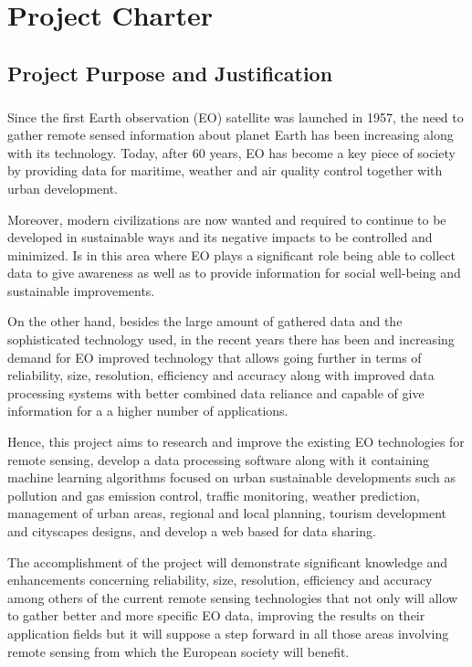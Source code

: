 \chapter{Project Charter}

\section{Project Purpose and Justification}

\paragraph{} 

Since the first Earth observation (EO) satellite was launched in 1957, the need to gather remote sensed information about planet Earth has been increasing along with its technology. Today, after 60 years, EO has become a key piece of society by providing data for maritime, weather and air quality control together with urban development. 

Moreover, modern civilizations are now wanted and required to continue to be developed in sustainable ways and its negative impacts to be controlled and minimized. Is in this area where EO plays a significant role being able to collect data to give awareness as well as to provide information for social well-being and sustainable improvements.

On the other hand, besides the large amount of gathered data and the sophisticated technology used, in the recent years there has been and increasing demand for EO improved technology that allows going further in terms of reliability, size, resolution, efficiency and accuracy along with improved data processing systems with better combined data reliance and capable of give information for a a higher number of applications. 


Hence, this project aims to research and improve the existing EO technologies for remote sensing, develop a data processing software along with it containing machine learning algorithms focused on urban sustainable developments such as pollution and gas emission control, traffic monitoring, weather prediction, management of urban areas, regional and local planning, tourism development and cityscapes designs, and develop a web based for data sharing. 


The accomplishment of the project will demonstrate significant knowledge and enhancements concerning reliability, size, resolution, efficiency and accuracy among others of the current remote sensing technologies that not only will allow to gather better and more specific EO data, improving the results on their application fields but it will suppose a step forward in all those areas involving remote sensing from which the European society will benefit. 

